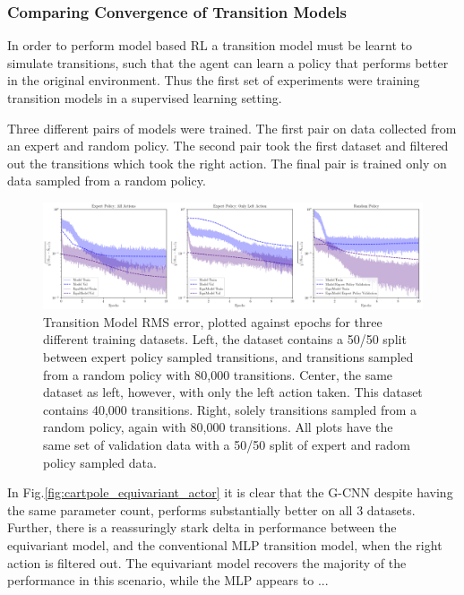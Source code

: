 \subsubsection{Comparing Convergence of Transition Models}
In order to perform model based RL a transition model must be learnt to simulate transitions, such that the agent can learn a policy that performs better in the original environment. Thus the first set of experiments were training transition models in a supervised learning setting.

Three different pairs of models were trained. The first pair on data collected from an expert and random policy. The second pair took the first dataset and filtered out the transitions which took the right action. The final pair is trained only on data sampled from a random policy.
\begin{figure}
	\centering
	\includegraphics*[width=\linewidth]{Figures/transition_model_cp.png}
	\caption{Transition Model RMS error, plotted against epochs for three different training datasets. Left, the dataset contains a 50/50 split between expert policy sampled transitions, and transitions sampled from a random policy with 80,000 transitions. Center, the same dataset as left, however, with only the left action taken. This dataset contains 40,000 transitions. Right, solely transitions sampled from a random policy, again with 80,000 transitions. All plots have the same set of validation data with a 50/50 split of expert and radom policy sampled data.}
	\label{fig:transition_model_cp}
\end{figure}
In Fig.\ref{fig:cartpole_equivariant_actor} it is clear that the G-CNN despite having the same parameter count, performs substantially better on all 3 datasets. Further, there is a reassuringly stark delta in performance between the equivariant model, and the conventional MLP transition model, when the right action is filtered out. The equivariant model recovers the majority of the performance in this scenario, while the MLP appears to ...


